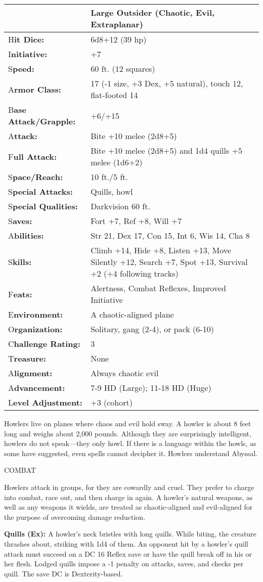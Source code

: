 \documentclass{article}
\begin{document}
\begin{tabular}{|>{\raggedright}p{91pt}|>{\raggedright}p{233pt}|}
\hline
  & Large Outsider (Chaotic, Evil, Extraplanar)\tabularnewline
\hline
H\textbf{it Dice:} & 6d8+12 (39 hp)\tabularnewline
\hline
I\textbf{nitiative:} & +7\tabularnewline
\hline
S\textbf{peed:} & 60 ft. (12 squares)\tabularnewline
\hline
A\textbf{rmor Class:} & 17 (-1 size, +3 Dex, +5 natural), touch 12, flat-footed 
14\tabularnewline
\hline
B\textbf{ase Attack/Grapple:} & +6/+15\tabularnewline
\hline
A\textbf{ttack:} & Bite +10 melee (2d8+5)\tabularnewline
\hline
F\textbf{ull Attack:} & Bite +10 melee (2d8+5) and 1d4 quills +5 melee (1d6+2)\tabularnewline
\hline
S\textbf{pace/Reach:} & 10 ft./5 ft.\tabularnewline
\hline
S\textbf{pecial Attacks:} & Quills, howl\tabularnewline
\hline
S\textbf{pecial Qualities:} & Darkvision 60 ft.\tabularnewline
\hline
S\textbf{aves:} & Fort +7, Ref +8, Will +7\tabularnewline
\hline
A\textbf{bilities:} & Str 21, Dex 17, Con 15, Int 6, Wis 14, Cha 8\tabularnewline
\hline
S\textbf{kills:} & Climb +14, Hide +8, Listen +13, Move Silently +12, Search +7, 
Spot +13, Survival +2 (+4 following tracks)\tabularnewline
\hline
F\textbf{eats:} & Alertness, Combat Reflexes, Improved Initiative\tabularnewline
\hline
E\textbf{nvironment:} & A chaotic-aligned plane\tabularnewline
\hline
O\textbf{rganization:} & Solitary, gang (2-4), or pack (6-10)\tabularnewline
\hline
C\textbf{hallenge Rating:} & 3\tabularnewline
\hline
T\textbf{reasure:} & None\tabularnewline
\hline
A\textbf{lignment:} & Always chaotic evil\tabularnewline
\hline
A\textbf{dvancement:} & 7-9 HD (Large); 11-18 HD (Huge)\tabularnewline
\hline
L\textbf{evel Adjustment:} & +3 (cohort)\tabularnewline
\hline
\end{tabular}

Howlers live on planes where chaos and evil hold sway. A howler is about 8 feet 
long and weighs about 2,000 pounds. Although they are surprisingly intelligent, 
howlers do not speak---they only howl. If there is a language within the howls, 
as some have suggested, even spells cannot decipher it. Howlers understand Abyssal.

COMBAT

Howlers attack in groups, for they are cowardly and cruel. They prefer to charge 
into combat, race out, and then charge in again. A howler's natural weapons, as 
well as any weapons it wields, are treated as chaotic-aligned and evil-aligned 
for the purpose of overcoming damage reduction.

\textbf{Quills (Ex):} A howler's neck bristles with long quills. While biting, 
the creature thrashes about, striking with 1d4 of them. An opponent hit by a howler's 
quill attack must succeed on a DC 16 Reflex save or have the quill break off in 
his or her flesh. Lodged quills impose a -1 penalty on attacks, saves, and checks 
per quill. The save DC is Dexterity-based.
\end{document}

